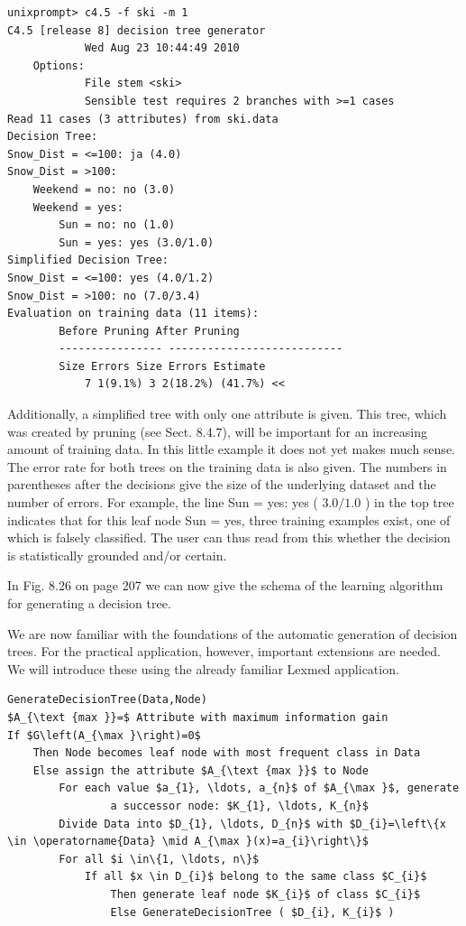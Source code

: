 \documentclass[10pt]{book}
\begin{document}
\begin{center}
\begin{enumerate}
\begin{center}
\begin{center}
\begin{verbatim}
unixprompt> c4.5 -f ski -m 1
C4.5 [release 8] decision tree generator
            Wed Aug 23 10:44:49 2010
    Options:
            File stem <ski>
            Sensible test requires 2 branches with >=1 cases
Read 11 cases (3 attributes) from ski.data
Decision Tree:
Snow_Dist = <=100: ja (4.0)
Snow_Dist = >100:
    Weekend = no: no (3.0)
    Weekend = yes:
        Sun = no: no (1.0)
        Sun = yes: yes (3.0/1.0)
Simplified Decision Tree:
Snow_Dist = <=100: yes (4.0/1.2)
Snow_Dist = >100: no (7.0/3.4)
Evaluation on training data (11 items):
        Before Pruning After Pruning
        ---------------- ---------------------------
        Size Errors Size Errors Estimate
            7 1(9.1%) 3 2(18.2%) (41.7%) <<
\end{verbatim}

Additionally, a simplified tree with only one attribute is given. This tree, which was created by pruning (see Sect. 8.4.7), will be important for an increasing amount of training data. In this little example it does not yet makes much sense. The error rate for both trees on the training data is also given. The numbers in parentheses after the decisions give the size of the underlying dataset and the number of errors. For example, the line Sun = yes: yes ( $3.0 / 1.0$ ) in the top tree indicates that for this leaf node Sun = yes, three training examples exist, one of which is falsely classified. The user can thus read from this whether the decision is statistically grounded and/or certain.

In Fig. 8.26 on page 207 we can now give the schema of the learning algorithm for generating a decision tree.

We are now familiar with the foundations of the automatic generation of decision trees. For the practical application, however, important extensions are needed. We will introduce these using the already familiar Lexmed application.

\begin{verbatim}
GenerateDecisionTree(Data,Node)
$A_{\text {max }}=$ Attribute with maximum information gain
If $G\left(A_{\max }\right)=0$
    Then Node becomes leaf node with most frequent class in Data
    Else assign the attribute $A_{\text {max }}$ to Node
        For each value $a_{1}, \ldots, a_{n}$ of $A_{\max }$, generate
                a successor node: $K_{1}, \ldots, K_{n}$
        Divide Data into $D_{1}, \ldots, D_{n}$ with $D_{i}=\left\{x \in \operatorname{Data} \mid A_{\max }(x)=a_{i}\right\}$
        For all $i \in\{1, \ldots, n\}$
            If all $x \in D_{i}$ belong to the same class $C_{i}$
                Then generate leaf node $K_{i}$ of class $C_{i}$
                Else GenerateDecisionTree ( $D_{i}, K_{i}$ )
\end{verbatim}


\end{center}
\end{center}
\end{enumerate}
\end{center}
\end{document}
